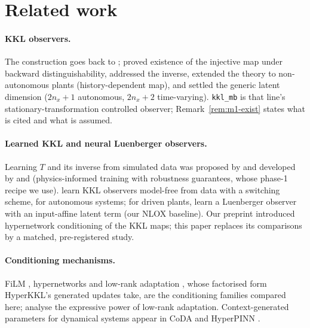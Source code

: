 \section{Related work}\label{sec:related}

\paragraph{KKL observers.} The construction goes back to \citet{kazantzis1998}; \citet{andrieu2006existence} proved existence of the injective map under backward distinguishability, \citet{bernard2017} addressed the inverse, \citet{bernard2019luenberger} extended the theory to non-autonomous plants (history-dependent map), and \citet{brivadis2023further} settled the generic latent dimension ($2n_x+1$ autonomous, $2n_x+2$ time-varying). \texttt{kkl\_mb} is that line's stationary-transformation controlled observer; Remark~\ref{rem:m1-exist} states what is cited and what is assumed.

\paragraph{Learned KKL and neural Luenberger observers.} Learning $T$ and its inverse from simulated data was proposed by \citet{ramos2020} and developed by \citet{janny2021,peralez2021,peralez2022,niazi2023,buisson2023} and \citet{niazi2025kkl} (physics-informed training with robustness guarantees, whose phase-1 recipe we use). \citet{peralez2024} learn KKL observers model-free from data with a switching scheme, for autonomous systems; for driven plants, \citet{woelk2026} learn a Luenberger observer with an input-affine latent term (our NLOX baseline). Our preprint \citep{shaaban2026hyperkkl} introduced hypernetwork conditioning of the KKL maps; this paper replaces its comparisons by a matched, pre-registered study.

\paragraph{Conditioning mechanisms.} FiLM \citep{perez2018film}, hypernetworks \citep{ha2016,chauhan2024} and low-rank adaptation \citep{hu2022}, whose factorised form HyperKKL's generated updates take, are the conditioning families compared here; \citet{zeng2024expressive} analyse the expressive power of low-rank adaptation. Context-generated parameters for dynamical systems appear in CoDA \citep{kirchmeyer2022coda} and HyperPINN \citep{belbuteperes2021hyperpinn}.

